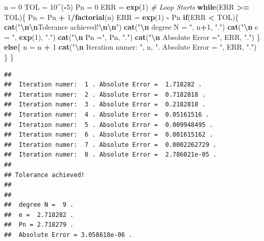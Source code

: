 \documentclass[
]{book}
\newenvironment{Shaded}{\begin{snugshade}}{\end{snugshade}}
\newcommand{\CommentTok}[1]{\textcolor[rgb]{0.56,0.35,0.01}{\textit{#1}}}
\newcommand{\ControlFlowTok}[1]{\textcolor[rgb]{0.13,0.29,0.53}{\textbf{#1}}}
\newcommand{\DecValTok}[1]{\textcolor[rgb]{0.00,0.00,0.81}{#1}}
\newcommand{\FunctionTok}[1]{\textcolor[rgb]{0.13,0.29,0.53}{\textbf{#1}}}
\newcommand{\NormalTok}[1]{#1}
\newcommand{\OtherTok}[1]{\textcolor[rgb]{0.56,0.35,0.01}{#1}}
\newcommand{\SpecialCharTok}[1]{\textcolor[rgb]{0.81,0.36,0.00}{\textbf{#1}}}
\newcommand{\StringTok}[1]{\textcolor[rgb]{0.31,0.60,0.02}{#1}}
\begin{document}
\begin{Shaded}
\begin{Highlighting}[]
\NormalTok{ n }\OtherTok{=} \DecValTok{0}
\NormalTok{ TOL }\OtherTok{=} \DecValTok{10}\SpecialCharTok{\^{}}\NormalTok{(}\SpecialCharTok{{-}}\DecValTok{5}\NormalTok{)}
\NormalTok{ Pn }\OtherTok{=} \DecValTok{0}
\NormalTok{ ERR }\OtherTok{=} \FunctionTok{exp}\NormalTok{(}\DecValTok{1}\NormalTok{) }
\CommentTok{\# Loop Starts}
\ControlFlowTok{while}\NormalTok{(ERR }\SpecialCharTok{\textgreater{}=}\NormalTok{ TOL)\{}
\NormalTok{  Pn }\OtherTok{=}\NormalTok{ Pn }\SpecialCharTok{+} \DecValTok{1}\SpecialCharTok{/}\FunctionTok{factorial}\NormalTok{(n)}
\NormalTok{  ERR }\OtherTok{=} \FunctionTok{exp}\NormalTok{(}\DecValTok{1}\NormalTok{) }\SpecialCharTok{{-}}\NormalTok{ Pn}
  \ControlFlowTok{if}\NormalTok{(ERR }\SpecialCharTok{\textless{}}\NormalTok{ TOL)\{}
     \FunctionTok{cat}\NormalTok{(}\StringTok{"}\SpecialCharTok{\textbackslash{}n\textbackslash{}n}\StringTok{Tolerance achieved!}\SpecialCharTok{\textbackslash{}n\textbackslash{}n}\StringTok{"}\NormalTok{)  }
     \FunctionTok{cat}\NormalTok{(}\StringTok{"}\SpecialCharTok{\textbackslash{}n}\StringTok{ degree N = "}\NormalTok{, n}\SpecialCharTok{+}\DecValTok{1}\NormalTok{, }\StringTok{"."}\NormalTok{)}
     \FunctionTok{cat}\NormalTok{(}\StringTok{"}\SpecialCharTok{\textbackslash{}n}\StringTok{ e = "}\NormalTok{, }\FunctionTok{exp}\NormalTok{(}\DecValTok{1}\NormalTok{), }\StringTok{"."}\NormalTok{)}
     \FunctionTok{cat}\NormalTok{(}\StringTok{"}\SpecialCharTok{\textbackslash{}n}\StringTok{ Pn ="}\NormalTok{, Pn, }\StringTok{"."}\NormalTok{)}
     \FunctionTok{cat}\NormalTok{(}\StringTok{"}\SpecialCharTok{\textbackslash{}n}\StringTok{ Absolute Error ="}\NormalTok{, ERR, }\StringTok{"."}\NormalTok{)     }
\NormalTok{  \} }\ControlFlowTok{else}\NormalTok{\{}
\NormalTok{          n }\OtherTok{=}\NormalTok{ n }\SpecialCharTok{+} \DecValTok{1}
     \FunctionTok{cat}\NormalTok{(}\StringTok{"}\SpecialCharTok{\textbackslash{}n}\StringTok{ Iteration numer: "}\NormalTok{, n, }\StringTok{". Absolute Error = "}\NormalTok{, ERR, }\StringTok{"."}\NormalTok{) }
\NormalTok{  \}}
\NormalTok{ \}}
\end{Highlighting}
\end{Shaded}

\begin{verbatim}
## 
##  Iteration numer:  1 . Absolute Error =  1.718282 .
##  Iteration numer:  2 . Absolute Error =  0.7182818 .
##  Iteration numer:  3 . Absolute Error =  0.2182818 .
##  Iteration numer:  4 . Absolute Error =  0.05161516 .
##  Iteration numer:  5 . Absolute Error =  0.009948495 .
##  Iteration numer:  6 . Absolute Error =  0.001615162 .
##  Iteration numer:  7 . Absolute Error =  0.0002262729 .
##  Iteration numer:  8 . Absolute Error =  2.786021e-05 .
## 
## Tolerance achieved!
## 
## 
##  degree N =  9 .
##  e =  2.718282 .
##  Pn = 2.718279 .
##  Absolute Error = 3.058618e-06 .
\end{verbatim}
\end{document}
